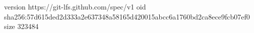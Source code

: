version https://git-lfs.github.com/spec/v1
oid sha256:57d615ded2d333a2e637348a58165d420015abcc6a1760bd2ca8ece9fcb07ef0
size 323484
